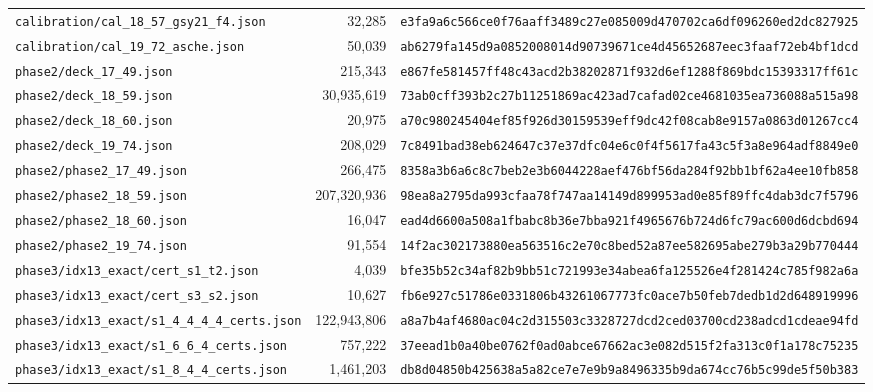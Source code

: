 \documentclass[11pt,reqno]{amsart}
\theoremstyle{definition}
\theoremstyle{remark}
\numberwithin{equation}{section}
\numberwithin{table}{section}
\begin{document}
{\begin{longtable}{@{}>{\raggedright\arraybackslash}p{1.90in}r>{\raggedright\arraybackslash}p{3.35in}@{}}
\nolinkurl{calibration/cal_18_57_gsy21_f4.json} & 32,285 & \nolinkurl{e3fa9a6c566ce0f76aaff3489c27e085009d470702ca6df096260ed2dc827925} \\
\nolinkurl{calibration/cal_19_72_asche.json} & 50,039 & \nolinkurl{ab6279fa145d9a0852008014d90739671ce4d45652687eec3faaf72eb4bf1dcd} \\
\nolinkurl{phase2/deck_17_49.json} & 215,343 & \nolinkurl{e867fe581457ff48c43acd2b38202871f932d6ef1288f869bdc15393317ff61c} \\
\nolinkurl{phase2/deck_18_59.json} & 30,935,619 & \nolinkurl{73ab0cff393b2c27b11251869ac423ad7cafad02ce4681035ea736088a515a98} \\
\nolinkurl{phase2/deck_18_60.json} & 20,975 & \nolinkurl{a70c980245404ef85f926d30159539eff9dc42f08cab8e9157a0863d01267cc4} \\
\nolinkurl{phase2/deck_19_74.json} & 208,029 & \nolinkurl{7c8491bad38eb624647c37e37dfc04e6c0f4f5617fa43c5f3a8e964adf8849e0} \\
\nolinkurl{phase2/phase2_17_49.json} & 266,475 & \nolinkurl{8358a3b6a6c8c7beb2e3b6044228aef476bf56da284f92bb1bf62a4ee10fb858} \\
\nolinkurl{phase2/phase2_18_59.json} & 207,320,936 & \nolinkurl{98ea8a2795da993cfaa78f747aa14149d899953ad0e85f89ffc4dab3dc7f5796} \\
\nolinkurl{phase2/phase2_18_60.json} & 16,047 & \nolinkurl{ead4d6600a508a1fbabc8b36e7bba921f4965676b724d6fc79ac600d6dcbd694} \\
\nolinkurl{phase2/phase2_19_74.json} & 91,554 & \nolinkurl{14f2ac302173880ea563516c2e70c8bed52a87ee582695abe279b3a29b770444} \\
\nolinkurl{phase3/idx13_exact/cert_s1_t2.json} & 4,039 & \nolinkurl{bfe35b52c34af82b9bb51c721993e34abea6fa125526e4f281424c785f982a6a} \\
\nolinkurl{phase3/idx13_exact/cert_s3_s2.json} & 10,627 & \nolinkurl{fb6e927c51786e0331806b43261067773fc0ace7b50feb7dedb1d2d648919996} \\
\nolinkurl{phase3/idx13_exact/s1_4_4_4_4_certs.json} & 122,943,806 & \nolinkurl{a8a7b4af4680ac04c2d315503c3328727dcd2ced03700cd238adcd1cdeae94fd} \\
\nolinkurl{phase3/idx13_exact/s1_6_6_4_certs.json} & 757,222 & \nolinkurl{37eead1b0a40be0762f0ad0abce67662ac3e082d515f2fa313c0f1a178c75235} \\
\nolinkurl{phase3/idx13_exact/s1_8_4_4_certs.json} & 1,461,203 & \nolinkurl{db8d04850b425638a5a82ce7e7e9b9a8496335b9da674cc76b5c99de5f50b383} \\

\end{longtable}}
\end{document}
